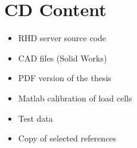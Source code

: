 








\prefrontmatter

\cleartoevenpage 

\clearforchapter

\frontmatter




\clearforchapter
\tableofcontents
\clearforchapter
\listoffigures 

\mainmatter




%



\appendix
%





%


\backmatter


\clearforchapter
\chapter*{CD Content}
\begin{itemize}
\item RHD server source code
\item CAD files (Solid Works)
\item PDF version of the thesis
\item Matlab calibration of load cells
\item Test data
\item Copy of selected references
\end{itemize}
\clearforchapter


